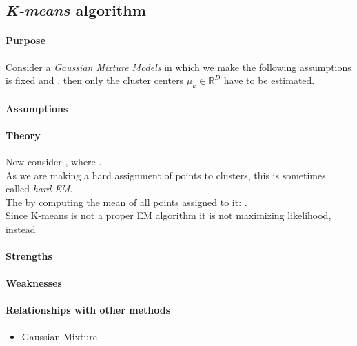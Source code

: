 \subsection{\emph{K-means} algorithm}
\paragraph{Purpose}
Consider a \emph{Gaussian Mixture Models} in which  we make the following assumptions  is fixed and , then only the cluster 
centers $\mu_{k}\in\mathbb{R}^{D}$ have to be estimated.\\
 
\paragraph{Assumptions}
\paragraph{Theory}
Now consider , where .\\
As we are making a hard assignment of points to clusters, this is sometimes called 
\emph{hard EM}. \\
The  by computing the mean of all points 
assigned to it: .\\
Since K-means is not a proper EM algorithm it is not maximizing likelihood, instead 
\paragraph{Strengths}
\paragraph{Weaknesses}
\paragraph{Relationships with other methods}
\begin{itemize}
    \item Gaussian Mixture
\end{itemize}

